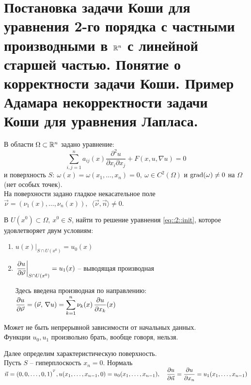 \documentclass[../main.tex]{subfiles}
\begin{document}
\section[Задача Коши в \texorpdfstring{$\R^n$}{R\textasciicircum n}]{Постановка задачи Коши для уравнения 2-го порядка с частными производными в $\R^n$ с линейной старшей частью. Понятие о корректности задачи Коши. Пример Адамара некорректности задачи Коши для уравнения Лапласа.}

В области $\Omega \subset \mathbb{R}^n$ задано уравнение:
\begin{equation}
\label{eq::2::init}
\sum\limits_{i,j=1}^{n} a_{ij}(x)\frac{\partial^2u}{\partial x_i\partial x_j} + F(x, u, \nabla u) = 0
\end{equation}
и поверхность $S\colon\ \omega(x) = \omega(x_1, \dots, x_n) = 0,\ \omega \in C^2(\Omega)$ и $\operatorname{grad}(\omega) \not= 0$ на $\Omega$ (нет особых точек).\\
На поверхности задано гладкое некасательное поле $\vec{\nu} = (\nu_1(x), \dots, \nu_n(x)),\ \; \langle \vec{\nu}, \vec{n} \rangle \not= 0$.
\begin{definition}
В $U(x^0)\subset\Omega,\ x^0 \in S$, найти то решение уравнения \eqref{eq::2::init}, которое удовлетворяет двум условиям:
\begin{enumerate}
\item $u(x)|_{S\cap U(x^0)}=u_0(x)$
\item $\left. \dfrac{\partial u}{\partial \vec{\nu}}\right|_{S\cap U(x^0)} = u_1(x)$ -- выводящая производная

Здесь введена производная по направлению: $\dfrac{\partial u}{\partial \vec{\nu}} = \left(\vec{\nu},\, \nabla u\right) = \displaystyle\sum\limits_{k=1}^{n} \nu_k(x)\, \dfrac{\partial u}{\partial x_k}(x) $
\end{enumerate}
\end{definition}
Может не быть непрерывной зависимости от начальных данных.\\
Функции $u_0, u_1$ произвольно брать, вообще говоря, нельзя.


Далее определим характеристическую поверхность.\\
Пусть $S$ -- гиперплоскость $x_n = 0$. Нормаль $\vec{n} = (0,0,\dots,0, 1)^{{}^T},\\
u(x_1, \dots, x_{n-1}, 0) = u_0(x_1, \dots, x_{n-1}),\quad \dfrac{\partial u}{\partial\vec{n}} = \dfrac{\partial u}{\partial x_n} = u_1(x_1, \dots, x_{n-1}) $
\end{document}
